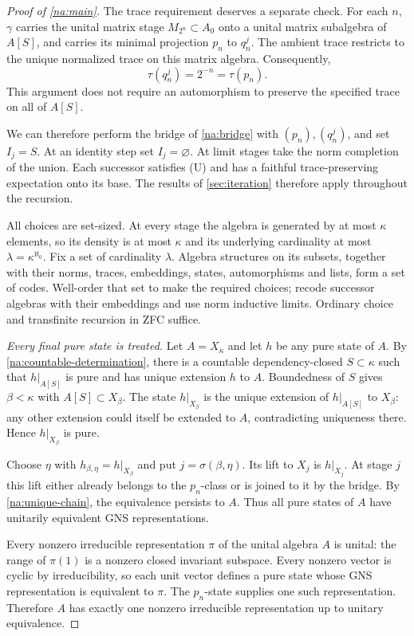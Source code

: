 \begin{proof}[Proof of \cref{na:main}]
The trace requirement deserves a separate check. For each $n$,
$\gamma$ carries the unital matrix stage $M_{2^n}\subset A_0$
onto a unital matrix subalgebra of $A[S]$, and carries its minimal
projection $p_n$ to $q_n^j$. The ambient trace restricts to the
unique normalized trace on this matrix algebra. Consequently,
\[
 \tau(q_n^j)=2^{-n}=\tau(p_n).
\]
This argument does not require an automorphism to preserve the
specified trace on all of $A[S]$.

We can therefore perform the bridge of \cref{na:bridge} with
$(p_n),(q_n^j)$, and set $I_j=S$. At an identity step set
$I_j=\varnothing$. At limit stages take the norm completion of
the union. Each successor satisfies \textup{(U)} and has a faithful
trace-preserving expectation onto its base. The results of
\cref{sec:iteration} therefore apply throughout the recursion.

All choices are set-sized. At every stage the algebra is generated
by at most $\kappa$ elements, so its density is at most $\kappa$
and its underlying cardinality at most $\lambda=\kappa^{\aleph_0}$.
Fix a set of cardinality $\lambda$. Algebra structures on its
subsets, together with their norms, traces, embeddings, states,
automorphisms and lists, form a set of codes. Well-order that set
to make the required choices; recode successor algebras with their
embeddings and use norm inductive limits. Ordinary choice and
transfinite recursion in ZFC suffice.

\smallskip\noindent
\emph{Every final pure state is treated.}
Let $A=X_\kappa$ and let $h$ be any pure state of $A$.
By \cref{na:countable-determination}, there is a countable
dependency-closed $S\subset\kappa$ such that $h|_{A[S]}$ is pure
and has unique extension $h$ to $A$. Boundedness of $S$ gives
$\beta<\kappa$ with $A[S]\subset X_\beta$.
The state $h|_{X_\beta}$ is the unique extension of $h|_{A[S]}$
to $X_\beta$: any other extension could itself be extended to
$A$, contradicting uniqueness there. Hence $h|_{X_\beta}$ is pure.

Choose $\eta$ with $h_{\beta,\eta}=h|_{X_\beta}$ and put
$j=\sigma(\beta,\eta)$. Its lift to $X_j$ is $h|_{X_j}$.
At stage $j$ this lift either already belongs to the $p_n$-class
or is joined to it by the bridge. By \cref{na:unique-chain}, the
equivalence persists to $A$. Thus all pure states of $A$ have
unitarily equivalent GNS representations.

Every nonzero irreducible representation $\pi$ of the unital
algebra $A$ is unital: the range of $\pi(1)$ is a nonzero closed
invariant subspace. Every nonzero vector is cyclic by irreducibility,
so each unit vector defines a pure state whose GNS representation
is equivalent to $\pi$. The $p_n$-state supplies one such
representation. Therefore $A$ has exactly one nonzero irreducible
representation up to unitary equivalence.


\end{proof}
